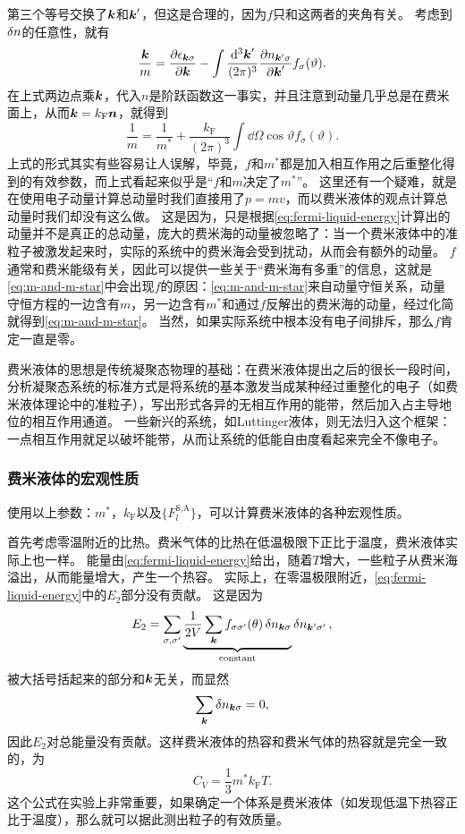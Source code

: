 第三个等号交换了$\vb*{k}$和$\vb*{k}'$，但这是合理的，因为$f$只和这两者的夹角有关。
考虑到$\var{n}$的任意性，就有
\[
    \frac{\vb*{k}}{m} = \pdv{\epsilon_{\vb*{k} \sigma}}{\vb*{k}} - \int \frac{\dd[3]{\vb*{k}'}}{(2\pi)^3} \pdv{n_{\vb*{k}' \sigma}}{\vb*{k}'} f_{\sigma}(\vartheta).
\]
在上式两边点乘$\vb*{k}$，代入$n$是阶跃函数这一事实，并且注意到动量几乎总是在费米面上，从而$\vb*{k} = k_\text{F} \vb*{n}$，就得到
\begin{equation}
    \frac{1}{m} = \frac{1}{m^*} + \frac{k_\text{F}}{(2\pi)^3} \int \dd{\Omega} \cos \vartheta f_\sigma(\vartheta).
    \label{eq:m-and-m-star}
\end{equation}
上式的形式其实有些容易让人误解，毕竟，$f$和$m^*$都是加入相互作用之后重整化得到的有效参数，而上式看起来似乎是“$f$和$m$决定了$m^*$”。
这里还有一个疑难，就是在使用电子动量计算总动量时我们直接用了$p=mv$，而以费米液体的观点计算总动量时我们却没有这么做。
这是因为，只是根据\eqref{eq:fermi-liquid-energy}计算出的动量并不是真正的总动量，庞大的费米海的动量被忽略了：当一个费米液体中的准粒子被激发起来时，实际的系统中的费米海会受到扰动，从而会有额外的动量。
$f$通常和费米能级有关，因此可以提供一些关于“费米海有多重”的信息，这就是\eqref{eq:m-and-m-star}中会出现$f$的原因：\eqref{eq:m-and-m-star}来自动量守恒关系，动量守恒方程的一边含有$m$，另一边含有$m^*$和通过$f$反解出的费米海的动量，经过化简就得到\eqref{eq:m-and-m-star}。
当然，如果实际系统中根本没有电子间排斥，那么$f$肯定一直是零。

费米液体的思想是传统凝聚态物理的基础：在费米液体提出之后的很长一段时间，分析凝聚态系统的标准方式是将系统的基本激发当成某种经过重整化的电子（如费米液体理论中的准粒子），写出形式各异的无相互作用的能带，然后加入占主导地位的相互作用通道。
一些新兴的系统，如Luttinger液体，则无法归入这个框架：一点相互作用就足以破坏能带，从而让系统的低能自由度看起来完全不像电子。

\subsubsection{费米液体的宏观性质}

使用以上参数：$m^*$，$k_\text{F}$以及$\{F_l^\text{S,A}\}$，可以计算费米液体的各种宏观性质。

首先考虑零温附近的比热。费米气体的比热在低温极限下正比于温度，费米液体实际上也一样。
能量由\eqref{eq:fermi-liquid-energy}给出，随着$T$增大，一些粒子从费米海溢出，从而能量增大，产生一个热容。
实际上，在零温极限附近，\eqref{eq:fermi-liquid-energy}中的$E_2$部分没有贡献。
这是因为
\[
    E_2 = \sum_{\sigma, \sigma'} \underbrace{\frac{1}{2V} \sum_{\vb*{k}} f_{\sigma \sigma'}(\theta) \var{n}_{\vb*{k} \sigma}}_{\text{constant}} \var{n}_{\vb*{k}' \sigma'},
\]
被大括号括起来的部分和$\vb*{k}$无关，而显然
\[
    \sum_{\vb*{k}} \var{n}_{\vb*{k} \sigma} = 0,
\]
因此$E_2$对总能量没有贡献。这样费米液体的热容和费米气体的热容就是完全一致的，为
\begin{equation}
    C_V = \frac{1}{3} m^* k_\text{F} T.
\end{equation}
这个公式在实验上非常重要，如果确定一个体系是费米液体（如发现低温下热容正比于温度），那么就可以据此测出粒子的有效质量。

